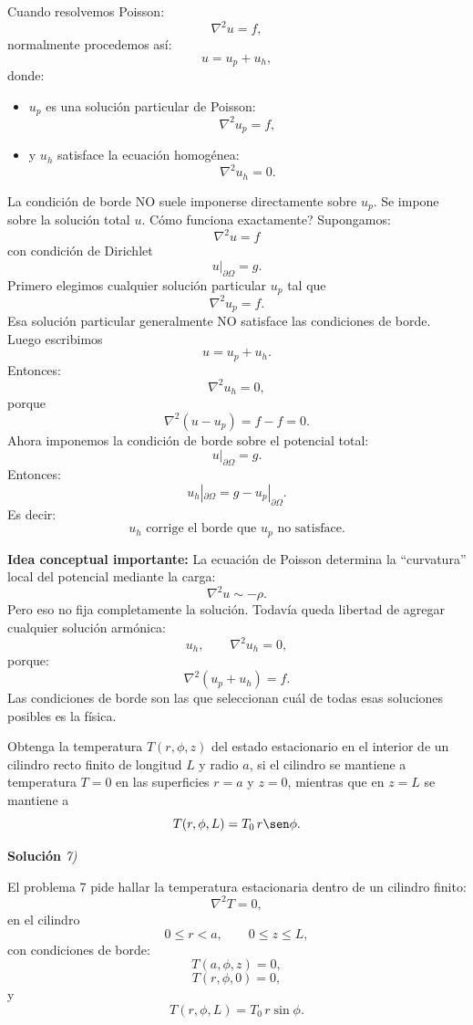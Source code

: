 \documentclass[11pt,spanish]{article}
\newcounter{problema}
\newcommand{\prob}{\stepcounter{problema} \vspace{.5cm} \noindent{\bf Problema \arabic{problema}: }}
\begin{document}
Cuando resolvemos Poisson:
$$
\nabla^2 u=f,
$$
normalmente procedemos así:
$$
u=u_p+u_h,
$$
donde:
\begin{itemize}
\item $u_p$ es una solución particular de Poisson:
$$
\nabla^2 u_p=f,
$$

\item y $u_h$ satisface la ecuación homogénea:
$$
\nabla^2 u_h=0.
$$
\end{itemize}
La condición de borde NO suele imponerse directamente sobre $u_p$.
Se impone sobre la solución total $u$.
Cómo funciona exactamente?
Supongamos:
$$
\nabla^2 u=f
$$
con condición de Dirichlet
$$
u|_{\partial\Omega}=g.
$$
Primero elegimos cualquier solución particular $u_p$ tal que
$$
\nabla^2 u_p=f.
$$
Esa solución particular generalmente NO satisface las condiciones de borde.
Luego escribimos
$$
u=u_p+u_h.
$$
Entonces:
$$
\nabla^2 u_h=0,
$$
porque
$$
\nabla^2(u-u_p)=f-f=0.
$$
Ahora imponemos la condición de borde sobre el potencial total:
$$
u|_{\partial\Omega}=g.
$$
Entonces:
$$
u_h|_{\partial\Omega}
=
g-u_p|_{\partial\Omega}.
$$
Es decir:
$$
\boxed{
u_h \text{ corrige el borde que } u_p \text{ no satisface.}
}
$$

{\bf Idea conceptual importante:}
La ecuación de Poisson determina la ``curvatura'' local del potencial mediante la carga:
$$
\nabla^2 u \sim -\rho.
$$
Pero eso no fija completamente la solución.
Todavía queda libertad de agregar cualquier solución armónica:
$$
u_h,
\qquad
\nabla^2 u_h=0,
$$
porque:
$$
\nabla^2(u_p+u_h)=f.
$$
Las condiciones de borde son las que seleccionan cuál de todas esas soluciones posibles es la física.


\prob Obtenga la temperatura \(T(r,\phi,z)\) del estado estacionario en el interior de un cilindro recto finito de longitud \(L\) y radio \(a\), si el cilindro se mantiene a temperatura \(T=0\) en las superficies \(r=a\) y \(z=0\), mientras que en \(z=L\) se mantiene a
\[
T(r,\phi,L) = T_0\, r \sen\phi.
\]

\vspace{0.5cm}
{\bf Soluci\'on }{\em 7)}
\vspace{0.5cm}

El problema 7 pide hallar la temperatura estacionaria dentro de un cilindro finito: 
$$
\nabla^2 T=0,
$$
en el cilindro
$$
0\le r<a,
\qquad
0\le z\le L,
$$
con condiciones de borde:
$$
T(a,\phi,z)=0,
$$
$$
T(r,\phi,0)=0,
$$
y
$$
T(r,\phi,L)=T_0\, r\sin\phi.
$$
\end{document}
